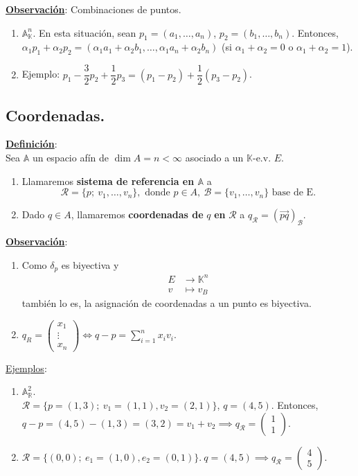 \documentclass[11pt]{article}
\newcommand{\kev}{$\mathbb{K}$-e.v. }
\newcommand{\af}{\mathbb{A}}
\newcommand{\defi}{\underline{\textbf{Definición}}:\\}
\newcommand{\ej}{\underline{Ejemplos}:\\}
\newcommand{\obs}{\underline{\textbf{Observación}}: }
\begin{document}
\obs Combinaciones de puntos.
\begin{enumerate}
	\item $\af^n_{\mathbb{K}}$. En esta situación, sean $p_1=(a_1,\ldots,a_n)$, $p_2=(b_1,\ldots,b_n)$. Entonces, $\alpha_1p_1+\alpha_2p_2=(\alpha_1a_1+\alpha_2b_1,\ldots,\alpha_1a_n+\alpha_2b_n)$ (si $\alpha_1+\alpha_2=0$ o $\alpha_1+\alpha_2=1$).
	\item Ejemplo: $p_1-\dfrac{3}{2}p_2+\dfrac{1}{2}p_3=(p_1-p_2)+\dfrac{1}{2}(p_3-p_2)$.
\end{enumerate}
\subsection{Coordenadas.}
\defi Sea $\af$ un espacio afín de $\dim A=n<\infty$ asociado a un \kev $E$.
\begin{enumerate}
	\item Llamaremos \textbf{sistema de referencia en $\af$} a
	$$
	\mathcal{R}=\{p;\ v_1,\ldots,v_n\},\textrm{ donde }p\in A,\ \mathcal{B}=\{v_1,\ldots,v_n\}\textrm{ base de E}.
	$$
	\item Dado $q\in A$, llamaremos \textbf{coordenadas de} $q$ \textbf{en} $\mathcal{R}$ a $q_{\mathcal{R}}=(\vec{pq})_{\mathcal{B}}.$
\end{enumerate}
\obs
\begin{enumerate}
	\item Como $\delta_p$ es biyectiva y \begin{align*}
		E &\to \mathbb{K}^n\\
		v &\mapsto v_B
	\end{align*}
	también lo es, la asignación de coordenadas a un punto es biyectiva.
	\item $q_R=\begin{pmatrix}
	x_1\\
	\vdots\\
	x_n
	\end{pmatrix}\iff q-p=\sum_{i=1}^nx_iv_i.$
\end{enumerate}
\ej
\begin{enumerate}
	\item $\af^2_{\mathbb{R}}$.\\
	$\mathcal{R}=\{p=(1,3);\ v_1=(1,1),v_2=(2,1)\}$, $q=(4,5)$. Entonces, $q-p=(4,5)-(1,3)=(3,2)=v_1+v_2\implies q_{\mathcal{R}}=\begin{pmatrix}
	1\\
	1
	\end{pmatrix}.$
	\item $\mathcal{R}=\{(0,0);\ e_1=(1,0),e_2=(0,1)\}.\ q=(4,5)\implies q_{\mathcal{R}}=\begin{pmatrix}
	4\\
	5
	\end{pmatrix}$.
\end{enumerate}
\end{document}
